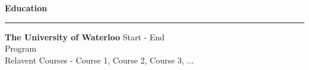 

\textbf{Education}

\par\noindent\rule{\textwidth}{0.2pt}


\textbf{The University of Waterloo} \hfill {Start - End} \\
{Program} \\
{Relavent Courses} - {Course 1, Course 2, Course 3, ...} \\
